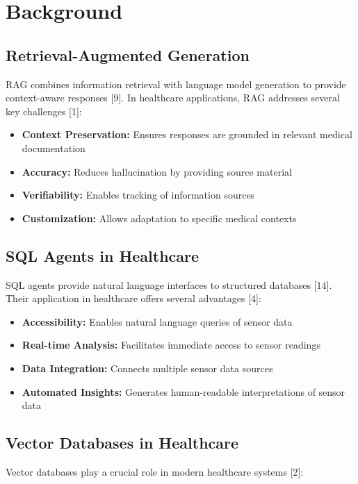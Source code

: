 \section{Background}

\subsection{Retrieval-Augmented Generation}
RAG combines information retrieval with language model generation to provide context-aware responses [9]. In healthcare applications, RAG addresses several key challenges [1]:

\begin{itemize}
\item \textbf{Context Preservation:} Ensures responses are grounded in relevant medical documentation
\item \textbf{Accuracy:} Reduces hallucination by providing source material
\item \textbf{Verifiability:} Enables tracking of information sources
\item \textbf{Customization:} Allows adaptation to specific medical contexts
\end{itemize}

\subsection{SQL Agents in Healthcare}
SQL agents provide natural language interfaces to structured databases [14]. Their application in healthcare offers several advantages [4]:

\begin{itemize}
\item \textbf{Accessibility:} Enables natural language queries of sensor data
\item \textbf{Real-time Analysis:} Facilitates immediate access to sensor readings
\item \textbf{Data Integration:} Connects multiple sensor data sources
\item \textbf{Automated Insights:} Generates human-readable interpretations of sensor data
\end{itemize}

\subsection{Vector Databases in Healthcare}
Vector databases play a crucial role in modern healthcare systems [2]:

